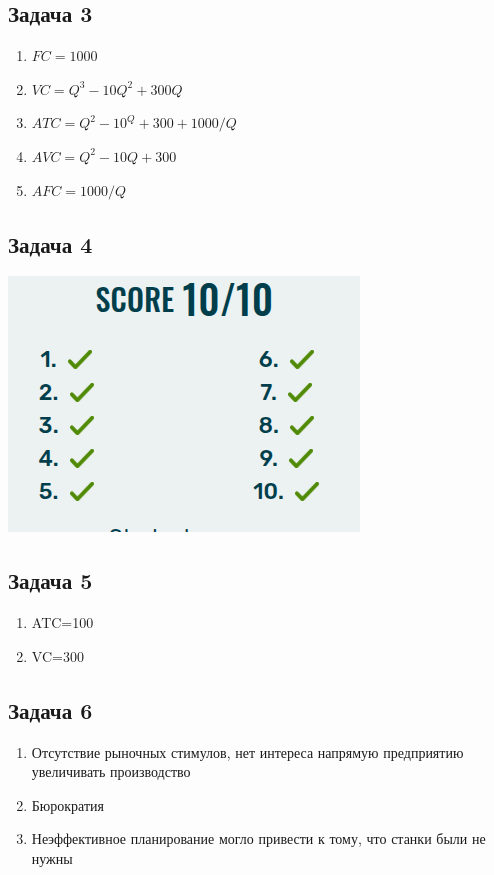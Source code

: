 \documentclass[a4paper,12pt]{article}
\begin{document}
\subsection{Задача 3}
\begin{enumerate}
    \item $FC=1000$
    \item $VC = Q^3-10Q^2+300Q$
    \item $ATC = Q^2-10^Q+300+1000/Q$
    \item $AVC = Q^2-10Q+300$
    \item $AFC=1000/Q$
\end{enumerate}

\subsection{Задача 4}

\includegraphics[scale=0.3]{graphs/5.3.png}

\subsection{Задача 5}
\begin{enumerate}
    \item ATC=100
    \item VC=300
\end{enumerate}

\subsection{Задача 6}
\begin{enumerate}
    \item Отсутствие рыночных стимулов, нет интереса напрямую предприятию увеличивать производство
    \item Бюрократия
    \item Неэффективное планирование могло привести к тому, что станки были не нужны
\end{enumerate}
\end{document}
